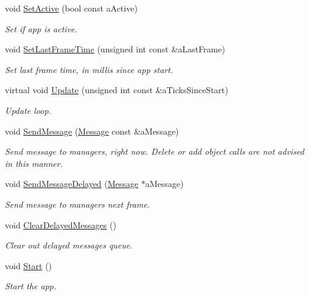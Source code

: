 \begin{DoxyCompactItemize}
void \hyperlink{classGameApp_a011807f70bdd3da9ae9f7c5fe7558236}{Set\+Active} (bool const a\+Active)
\begin{DoxyCompactList}\small\item\em Set if app is active. \end{DoxyCompactList}\item 
void \hyperlink{classGameApp_a3fc7a9b9f0cb06c27f61e4c255220cc4}{Set\+Last\+Frame\+Time} (unsigned int const \&a\+Last\+Frame)
\begin{DoxyCompactList}\small\item\em Set last frame time, in millis since app start. \end{DoxyCompactList}\item 
virtual void \hyperlink{classGameApp_ac92066eb567bd93cda45500c43fe443b}{Update} (unsigned int const \&a\+Ticks\+Since\+Start)
\begin{DoxyCompactList}\small\item\em Update loop. \end{DoxyCompactList}\item 
void \hyperlink{classGameApp_a2d894e3842f0c7206ab0d9ac9eada6d6}{Send\+Message} (\hyperlink{classMessage}{Message} const \&a\+Message)
\begin{DoxyCompactList}\small\item\em Send message to managers, right now. Delete or add object calls are not advised in this manner. \end{DoxyCompactList}\item 
void \hyperlink{classGameApp_a22213d4b9d1d314c73e05a0f49603fe1}{Send\+Message\+Delayed} (\hyperlink{classMessage}{Message} $\ast$a\+Message)
\begin{DoxyCompactList}\small\item\em Send message to managers next frame. \end{DoxyCompactList}\item 
void \hyperlink{classGameApp_a63d22bcd9b7a0f89c5bd030c4e1d3e4d}{Clear\+Delayed\+Messages} ()
\begin{DoxyCompactList}\small\item\em Clear out delayed messages queue. \end{DoxyCompactList}\item 
void \hyperlink{classGameApp_a0d047368e7c4c34da9f60c0fb3ce18de}{Start} ()
\begin{DoxyCompactList}\small\item\em Start the app. \end{DoxyCompactList}\item 

\end{DoxyCompactItemize}
